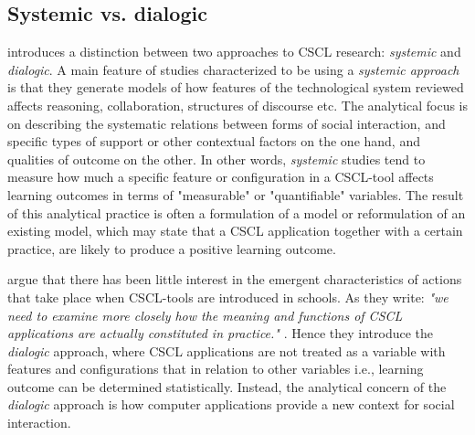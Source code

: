 \subsection{Systemic vs. dialogic}
\citet{arnseth2006approaching} introduces a distinction between two approaches to CSCL research: \emph{systemic} and \emph{dialogic}. A main feature of studies characterized to be using a \emph{systemic approach} is that they generate models of how features of the technological system reviewed affects reasoning, collaboration, structures of discourse etc. The analytical focus is on describing the systematic relations between forms of social interaction, and specific types of support or other contextual factors on the one hand, and qualities of outcome on the other. \citep{arnseth2006approaching} In other words, \emph{systemic} studies tend to measure how much a specific feature or configuration in a CSCL-tool affects learning outcomes in terms of "measurable" or "quantifiable" variables. The result of this analytical practice is often a formulation of a model or reformulation of an existing model, which may state that a CSCL application together with a certain practice, are likely to produce a positive learning outcome.

\citeauthor*{arnseth2006approaching} argue that there has been little interest in the emergent characteristics of actions that take place when CSCL-tools are introduced in schools. As they write: \emph{"we need to examine more closely how the meaning and functions of CSCL applications are actually constituted in practice."} \citep[p. 181]{arnseth2006approaching}. Hence they introduce the \emph{dialogic} approach, where CSCL applications are not treated as a variable with features and configurations that in relation to other variables i.e., learning outcome can be determined statistically. Instead, the analytical concern  of the \emph{dialogic} approach is how computer applications provide a new context for social interaction.





